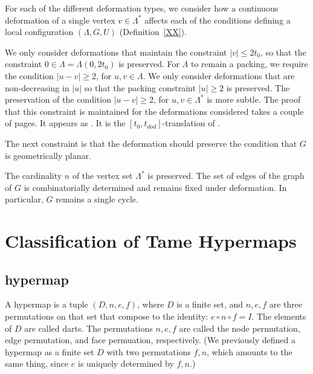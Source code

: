For each of the different deformation types, we consider 
how a continuous deformation of a single vertex $v\in\Lambda^*$
affects each of the conditions
defining a local configuration $(\Lambda,G,U)$  (Definition~\ref{XX}). 

We only consider deformations that maintain the constraint $|v|\le 2t_0$,
so that the constraint $0\in\Lambda=\Lambda(0,2t_0)$ is preserved.
For $\Lambda$ to remain a packing, we require the condition
 $|u-v|\ge 2$, for $u,v\in \Lambda$.
We only consider deformations that are non-decreasing in $|u|$ so that
the packing constraint $|u|\ge 2$ is preserved.  The preservation of the
condition $|u-v|\ge 2$, for $u,v\in\Lambda^*$ is more subtle. 
The proof that this constraint is maintained for the deformations
considered  takes  a couple of pages.  It appears as \cite[Lemma~7.6]{arx}.
It is the $[t_0,t_{dod}]$-translation of \cite[Lemma~12.20]{DCG}.

The next constraint is that the deformation should preserve the condition
that $G$ is geometrically planar.

The cardinality $n$ of the vertex set $\Lambda^*$ is preserved.
The set of edges of the graph of $G$ is combinatorially determined and
remains fixed under deformation.  In particular, $G$ remains a single
cycle.  









\section{Classification of Tame Hypermaps}

\subsection{hypermap}

A hypermap is a tuple $(D,n,e,f)$, where $D$ is a finite
set, and $n,e,f$ are three permutations on that set that
compose to the identity:
$e\circ n\circ f = I$.  The elements of $D$ are called darts.
The permutations $n,e,f$ are called the node permutation,
edge permutation, and face permuation, respectively.
(We previously defined a hypermap as a finite set $D$ with
two permutations $f,n$, which amounts to the same thing,
since $e$ is uniquely determined by $f,n$.)

